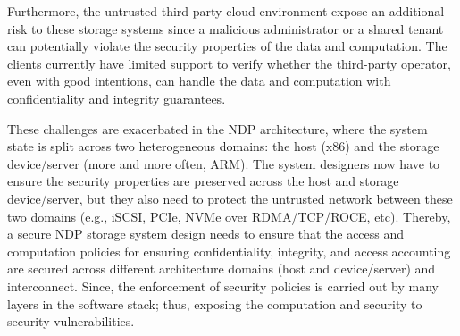 Furthermore, the untrusted third-party cloud environment expose an additional risk
to these storage systems since a malicious administrator or a shared tenant can potentially violate the security properties of the data and computation. The
clients currently have limited support to verify whether the
third-party operator, even with good intentions, can handle
the data and computation with confidentiality and integrity guarantees.

These challenges are exacerbated in the NDP architecture, where the system state is split across two heterogeneous domains: the host (x86) and the storage device/server (more and more often, ARM). The system designers now have to ensure the security properties are preserved across the host and storage device/server, but they also need to protect the untrusted network between these two domains (e.g., iSCSI, PCIe, NVMe over RDMA/TCP/ROCE, etc). Thereby, a secure NDP storage system design needs to ensure that the access and computation policies for ensuring confidentiality, integrity, and access accounting are secured across different architecture domains (host and device/server) and interconnect. Since, the enforcement of security policies is carried out by many layers in the software stack; thus, exposing the computation and security to security vulnerabilities.


